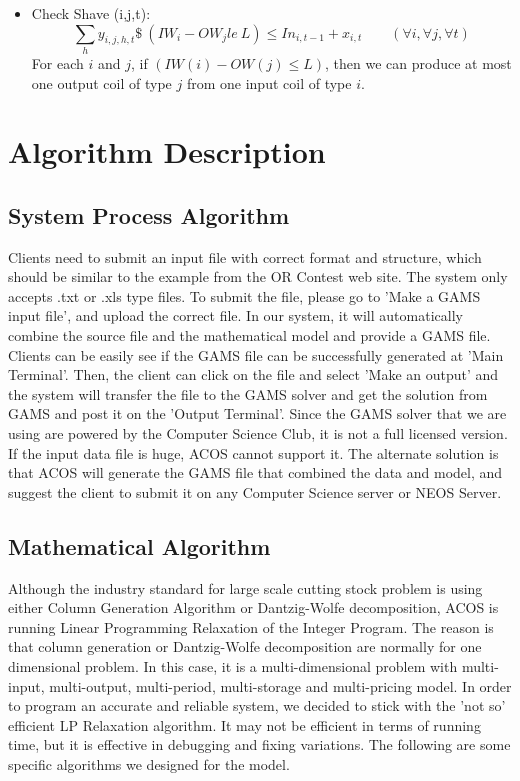 \documentclass{article}[12pt]
\begin{document}
\begin{itemize}
\item Check Shave (i,j,t): \\
\begin{displaymath}
\sum_{h} y_{i,j,h,t} \$\ (IW_{i} - OW_{j}  le\ L) \leq In_{i,t-1} + x_{i,t} \qquad (\forall i, \forall j, \forall t)
\end{displaymath}
For each $i$ and $j$, if $(IW(i) - OW(j) \le L)$, then we can produce at most one output coil of type $j$ from one input coil of type $i$.\\
\end{itemize}

\section{Algorithm Description} 

\subsection{System Process Algorithm}

Clients need to submit an input file with correct format and structure, which should be similar to the example from the OR Contest web site. The system only accepts .txt or .xls type files. To submit the file, please go to 'Make a GAMS input file', and upload the correct file. In our system, it will automatically combine the source file and the mathematical model and provide a GAMS file. Clients can be easily see if the GAMS file can be successfully generated at 'Main Terminal'. Then, the client can click on the file and select 'Make an output' and the system will transfer the file to the GAMS solver and get the solution from GAMS and post it on the 'Output Terminal'. Since the GAMS solver that we are using are powered by the Computer Science Club, it is not a full licensed version. If the input data file is huge, ACOS cannot support it. The alternate solution is that ACOS will generate the GAMS file that combined the data and model, and suggest the client to submit it on any Computer Science server or NEOS Server. \\

\subsection{Mathematical Algorithm}

Although the industry standard for large scale cutting stock problem is using either Column Generation Algorithm or Dantzig-Wolfe decomposition, ACOS is running Linear Programming Relaxation of the Integer Program. The reason is that column generation or Dantzig-Wolfe decomposition are normally for one dimensional problem. In this case, it is a multi-dimensional problem with multi-input, multi-output, multi-period, multi-storage and multi-pricing model. In order to program an accurate and reliable system, we decided to stick with the 'not so' efficient LP Relaxation algorithm. It may not be efficient in terms of running time, but it is effective in debugging and fixing variations.  
The following are some specific algorithms we designed for the model. \\
\end{document}

